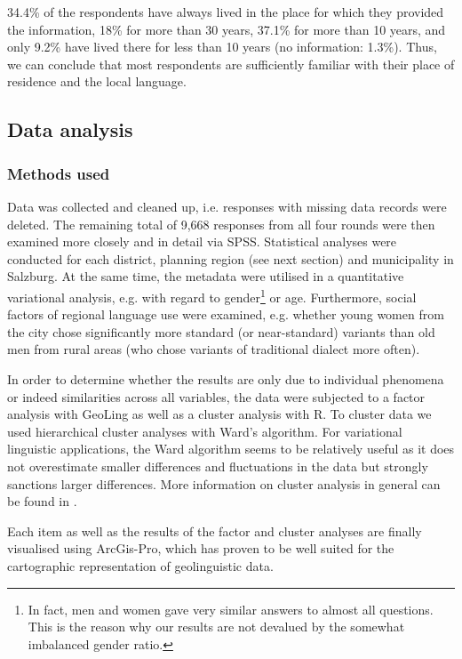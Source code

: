 \documentclass[output=paper,colorlinks, citecolor=brown]{langscibook}
\begin{document}
34.4\% of the respondents have always lived in the place for which they provided the information, 18\% for more than 30 years, 37.1\% for more than 10 years, and only 9.2\% have lived there for less than 10 years (no information: 1.3\%). Thus, we can conclude that most respondents are sufficiently familiar with their place of residence and the local language.

\subsection{Data analysis} \label{sec:blaßnigg:2.3}
\subsubsection{Methods used} \label{sec:blaßnigg:2.3.1}

Data was collected and cleaned up, i.e. responses with missing data records were deleted. The remaining total of 9,668 responses from all four rounds were then examined more closely and in detail via SPSS. Statistical analyses were conducted for each district, planning region (see next section) and municipality in Salzburg. At the same time, the metadata were utilised in a quantitative variational analysis, e.g. with regard to gender\footnote{In fact, men and women gave very similar answers to almost all questions. This is the reason why our results are not devalued by the somewhat imbalanced gender ratio.} or age. Furthermore, social factors of regional language use were examined, e.g. whether young women from the city chose significantly more standard (or near-standard) variants than old men from rural areas (who chose variants of traditional dialect more often).

In order to determine whether the results are only due to individual phenomena or indeed similarities across all variables, the data were subjected to a factor analysis with GeoLing as well as a cluster analysis with R. To cluster data we used hierarchical cluster analyses with Ward’s algorithm. For variational linguistic applications, the Ward algorithm seems to be relatively useful as it does not overestimate smaller differences and fluctuations in the data but strongly sanctions larger differences. More information on cluster analysis in general can be found in .

Each item as well as the results of the factor and cluster analyses are finally visualised using ArcGis-Pro, which has proven to be well suited for the cartographic representation of geolinguistic data.
\end{document}
